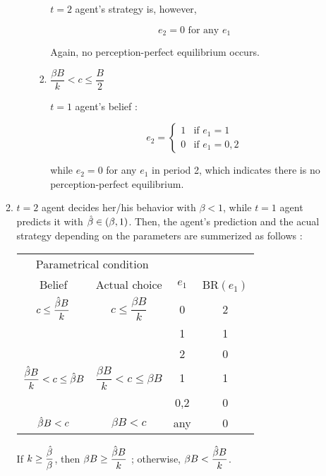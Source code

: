 \documentclass{jsarticle}
\begin{document}
\begin{enumerate}
\begin{enumerate}
\begin{itemize}
\begin{enumerate}
 $t=2$ agent's strategy is, however, 
 
 \[e_2=0 \text{ for any } e_1 \]
 
 Again, no perception-perfect equilibrium occurs.
 
 \item $\dfrac{\beta B}{k} < c \leq \dfrac{B}{2}$
 
 $t=1$ agent's belief :
 
 \[e_2 = \begin{cases}
 1 & \text{if } e_1=1 \\
 0 & \text{if } e_1=0,2
 \end{cases} \]
 
 while $e_2=0$ for any $e_1$ in period 2, which indicates there is no perception-perfect equilibrium.
 
  \end{enumerate}

\end{itemize}

\item 

$t=2$ agent decides her/his behavior with $\beta<1$, while $t=1$ agent predicts it with $\Hat{\beta} \in (\beta, 1)$. Then, the agent's prediction and the acual strategy depending on the parameters are summerized as follows :


\begin{center}

 \begin{tabular}{cccc} \hline
 \multicolumn{2}{c}{Parametrical condition} & & \\
 \multicolumn{1}{c}{Belief} & \multicolumn{1}{c}{Actual choice} & $e_1$ & BR$(e_1)$ \\ \hline
 $c \leq \dfrac{\Hat{\beta} B}{k}$  & $c \leq \dfrac{\beta B}{k}$ & 0 &2 \\
  & & 1 & 1 \\
  & & 2 & 0 \\
 $\dfrac{\Hat{\beta} B}{k} < c \leq \Hat{\beta} B$ & $\dfrac{\beta B}{k} < c \leq \beta B$ & 1 &1 \\
  & & 0,2 & 0 \\
 $\Hat{\beta} B < c$ & $\beta B < c$ & any & 0 \\ \hline
 \end{tabular}

\end{center}

\vspace{1zw}

If $k \geq \dfrac{\Hat{\beta}}{\beta}$, then $\beta B \geq \dfrac{\Hat{\beta}B}{k}$ ; otherwise, $\beta B < \dfrac{\Hat{\beta}B}{k}$.


\end{enumerate}
\end{enumerate}
\end{document}
